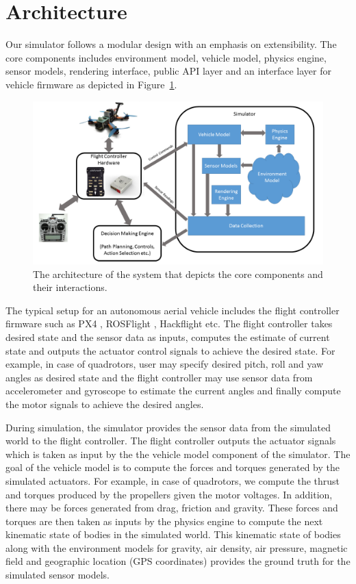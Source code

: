 \documentclass[graybox]{svmult}
\begin{document}
	\section{Architecture}
	Our simulator follows a modular design with an emphasis on extensibility. The core components includes environment model, vehicle model, physics engine, sensor models, rendering interface, public API layer and an interface layer for vehicle firmware as depicted in Figure~\ref{fig:arch}.
	
	\begin{figure}[ttbp]
		\includegraphics[width=\textwidth]{overview.PNG}
		\caption{The architecture of the system that depicts the core components and their interactions.}
		\label{fig:arch}
	\end{figure}
	
	The typical setup for an autonomous aerial vehicle includes the flight controller firmware such as PX4 \cite{meier2011pixhawk}, ROSFlight \cite{jackson2016rosflight}, Hackflight\cite{levyHackflight} etc. The flight controller takes desired state and the sensor data as inputs, computes the estimate of current state and outputs the actuator control signals to achieve the desired state. For example, in case of quadrotors, user may specify desired pitch, roll and yaw angles as desired state and the flight controller may use sensor data from accelerometer and gyroscope to estimate the current angles and finally compute the motor signals to achieve the desired angles.
	
	During simulation, the simulator provides the sensor data from the simulated world to the flight controller. The flight controller outputs the actuator signals which is taken as input by the the vehicle model component of the simulator. The goal of the vehicle model is to compute the forces and torques generated by the simulated actuators. For example, in case of quadrotors, we compute the thrust and torques produced by the propellers given the motor voltages. In addition, there may be forces generated from drag, friction and gravity. These forces and torques are then taken as inputs by the physics engine to compute the next kinematic state of bodies in the simulated world. This kinematic state of bodies along with the environment models for gravity, air density, air pressure, magnetic field and geographic location (GPS coordinates) provides the ground truth for the simulated sensor models.
	
\end{document}
